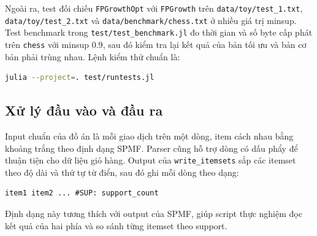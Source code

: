 Ngoài ra, test đối chiếu \texttt{FPGrowthOpt} với \texttt{FPGrowth} trên \texttt{data/toy/test\_1.txt}, \texttt{data/toy/test\_2.txt} và \texttt{data/benchmark/chess.txt} ở nhiều giá trị minsup. Test benchmark trong \texttt{test/test\_benchmark.jl} đo thời gian và số byte cấp phát trên \texttt{chess} với minsup $0.9$, sau đó kiểm tra lại kết quả của bản tối ưu và bản cơ bản phải trùng nhau. Lệnh kiểm thử chuẩn là:

\begin{lstlisting}[language=bash, caption={Lệnh chạy bộ test.}]
julia --project=. test/runtests.jl
\end{lstlisting}

\subsection{Xử lý đầu vào và đầu ra}

Input chuẩn của đồ án là mỗi giao dịch trên một dòng, item cách nhau bằng khoảng trắng theo định dạng SPMF. Parser cũng hỗ trợ dòng có dấu phẩy để thuận tiện cho dữ liệu giỏ hàng. Output của \texttt{write\_itemsets} sắp các itemset theo độ dài và thứ tự từ điển, sau đó ghi mỗi dòng theo dạng:

\begin{lstlisting}[caption={Định dạng output itemset.}]
item1 item2 ... #SUP: support_count
\end{lstlisting}

Định dạng này tương thích với output của SPMF, giúp script thực nghiệm đọc kết quả của hai phía và so sánh từng itemset theo support.
